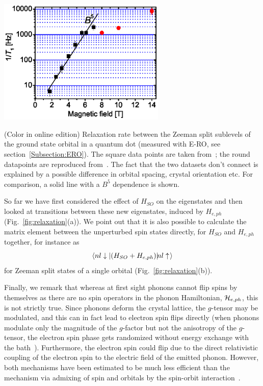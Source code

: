 \documentclass[12pt,aps,nofootinbib]{revtex4-1}
\begin{document}
\bfig
\begin{center}
\includegraphics[width=8cm]{hanson_fig23.eps}
\end{center}
\caption{(Color in online edition) Relaxation rate between the Zeeman split sublevels of the
ground state orbital in a quantum dot (measured with E-RO, see section~\ref{Subsection:ERO}). The square data points are taken from~\textcite{amasha06}; the round datapoints are reproduced from~\textcite{ElzermanNature2004}. The fact that the two datasets don't connect is explained by a possible difference in orbital spacing, crystal orientation etc. For
comparison, a solid line with a $B^5$ dependence is shown.}
\label{fig:amasha_elzerman} \efig

So far we have first considered the effect of $H_{SO}$ on the
eigenstates and then looked at transitions between these new
eigenstates, induced by $H_{e,ph}$ (Fig.~\ref{fig:relaxation}(a)).
We point out that it is also possible to calculate the matrix
element between the unperturbed spin states directly, for $H_{SO}$
and $H_{e,ph}$ together, for instance as
$$
\mbox{$\langle nl\downarrow|$}(H_{SO} + H_{e,ph}) \mbox{$|\!nl\uparrow\;\!\rangle$}
$$
for Zeeman split states of a single orbital
(Fig.~\ref{fig:relaxation}(b)).

Finally, we remark that whereas at first sight phonons cannot flip
spins by themselves as there are no spin operators in the phonon
Hamiltonian, ${\cal H}_{e,ph}$, this is not strictly true.
Since phonons deform the crystal lattice, the $g$-tensor may be
modulated, and this can in fact lead to electron spin flips
directly (when phonons modulate only the magnitude of the
$g$-factor but not the anisotropy of the $g$-tensor, the electron
spin phase gets randomized without energy exchange with the
bath~\cite{semenov04}). Furthermore, the electron spin could flip
due to the direct relativistic coupling of the electron spin to
the electric field of the emitted phonon. However, both mechanisms
have been estimated to be much less efficient than the mechanism
via admixing of spin and orbitals by the spin-orbit
interaction~\cite{khaetskii00,khaetskii01}.
\end{document}
